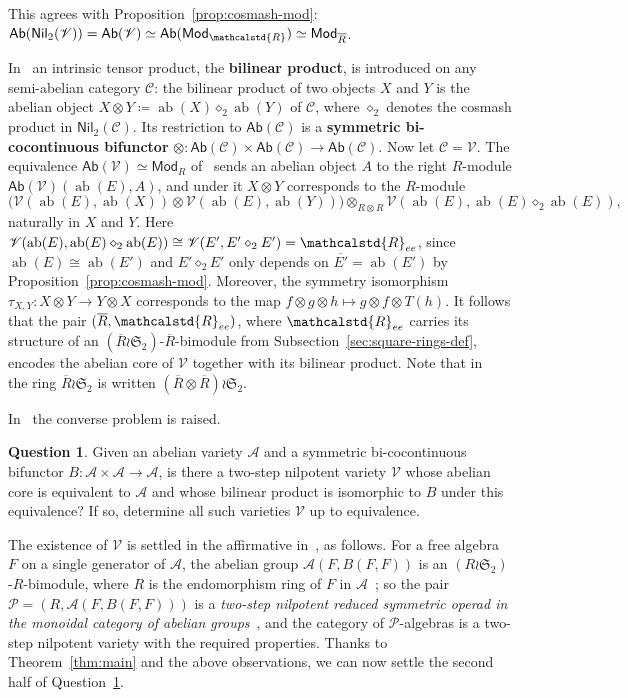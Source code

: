 \documentclass[reqno,a4paper]{amsart}
\theoremstyle{plain}
\theoremstyle{definition}
\newtheorem{question}[subsection]{Question}
\newcommand{\defn}{\textbf}
\newcommand{\DefEq}{\coloneq}
\newcommand{\C}{\ensuremath{\mathcal{C}}}
\newcommand{\V}{\ensuremath{\mathcal{V}}}
\newcommand{\A}{\ensuremath{\mathcal{A}}}
\newcommand{\R}{\ensuremath{\mathcalstd{R}}}
\newcommand{\Ab}{\ensuremath{\mathsf{Ab}}}
\newcommand{\Mod}{\ensuremath{\mathsf{Mod}}}
\newcommand{\Nil}{\ensuremath{\mathsf{Nil}}}
\renewcommand{\P}{\ensuremath{\mathcal{P}}}
\DeclareMathOperator{\ab}{ab}
\newcommand{\cosmash}{\ensuremath{\diamond}}
\newcommand{\Ree}{\ensuremath{\R_{ee}}}
\newcommand{\Rbar}{\ensuremath{\overline{R}}}
\begin{document}
This agrees with Proposition~\ref{prop:cosmash-mod}: \(\Ab(\Nil_{2}(\V))=\Ab(\V)\simeq\Ab(\Mod_{\R})\simeq\Mod_{\Rbar}\).

In~\cite{DHVdL} an intrinsic tensor product, the \defn{bilinear product}, is introduced on any semi-abelian category \(\C\): the bilinear product of two objects \(X\) and \(Y\) is the abelian object \(X\otimes Y\DefEq\ab(X)\cosmash_{2}\ab(Y)\) of \(\C\), where \(\cosmash_{2}\) denotes the cosmash product in \(\Nil_{2}(\C)\). Its restriction to \(\Ab(\C)\) is a \defn{symmetric bi-cocontinuous bifunctor} \(\otimes\colon \Ab(\C)\times\Ab(\C)\to\Ab(\C)\). Now let \(\C=\V\). The equivalence \(\Ab(\V)\simeq\Mod_{R}\) of~\cite{Freyd} sends an abelian object \(A\) to the right \(R\)-module \(\Ab(\V)(\ab(E),A)\), and under it \(X\otimes Y\) corresponds to the \(R\)-module
\[
  \bigl(\V(\ab(E),\ab(X))\otimes\V(\ab(E),\ab(Y))\bigr)\otimes_{R\otimes R}\V(\ab(E),\ab(E)\cosmash_{2}\ab(E))\text{,}
\]
naturally in \(X\) and \(Y\). Here \(\V(\ab(E),\ab(E)\cosmash_{2}\ab(E))\cong\V(E',E'\cosmash_{2}E')=\Ree\), since \(\ab(E)\cong\ab(E')\) and \(E'\cosmash_{2}E'\) only depends on \(\overline{E'}=\ab(E')\) by Proposition~\ref{prop:cosmash-mod}. Moreover, the symmetry isomorphism \(\tau_{X,Y}\colon X\otimes Y\to Y\otimes X\) corresponds to the map \(f\otimes g\otimes h\mapsto g\otimes f\otimes T(h)\). It follows that the pair \((\Rbar,\Ree)\), where \(\Ree\) carries its structure of an \((\Rbar\wr\mathfrak{S}_{2})\)-\(\Rbar\)-bimodule from Subsection~\ref{sec:square-rings-def}, encodes the abelian core of \(\V\) together with its bilinear product. Note that in~\cite{DHVdL} the ring \(\Rbar\wr\mathfrak{S}_{2}\) is written \((\Rbar\otimes\Rbar)\wr\mathfrak{S}_{2}\).

In~\cite{DHVdL} the converse problem is raised.

\begin{question}\label{q:realisation}
  Given an abelian variety \(\A\) and a symmetric bi-cocontinuous bifunctor \(B\colon \A\times\A\to\A\), is there a two-step nilpotent variety \(\V\) whose abelian core is equivalent to \(\A\) and whose bilinear product is isomorphic to \(B\) under this equivalence? If so, determine all such varieties \(\V\) up to equivalence.
\end{question}

The existence of \(\V\) is settled in the affirmative in~\cite[Theorem~7.6]{DHVdL}, as follows. For a free algebra \(F\) on a single generator of \(\A\), the abelian group \(\A(F,B(F,F))\) is an \((R\wr\mathfrak{S}_{2})\)-\(R\)-bimodule, where \(R\) is the endomorphism ring of \(F\) in \(\A\)~\cite[proof of Theorem~7.6]{DHVdL}; so the pair \(\P=(R,\A(F,B(F,F)))\) is a \emph{two-step nilpotent reduced symmetric operad in the monoidal category of abelian groups}~\cite[Remark~6.6]{DHVdL}, and the category of \(\P\)-algebras is a two-step nilpotent variety with the required properties. Thanks to Theorem~\ref{thm:main} and the above observations, we can now settle the second half of Question~\ref{q:realisation}.
\end{document}
